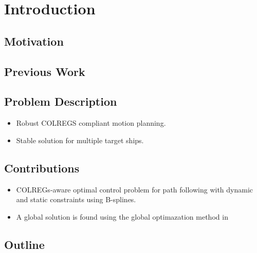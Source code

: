 
\chapter{Introduction}


\section{Motivation}


\section{Previous Work}

\section{Problem Description}
\begin{itemize}
    \item 
    Robust COLREGS compliant motion planning. 
    \item 
    Stable solution for multiple target ships.  

\end{itemize}
\section{Contributions}

\begin{itemize}
    \item COLREGs-aware optimal control problem for path following with dynamic and static constraints using B-splines.
    \item A global solution is found using the global optimazation method in \citep{Grimstad2016}
\end{itemize}


\section{Outline}
